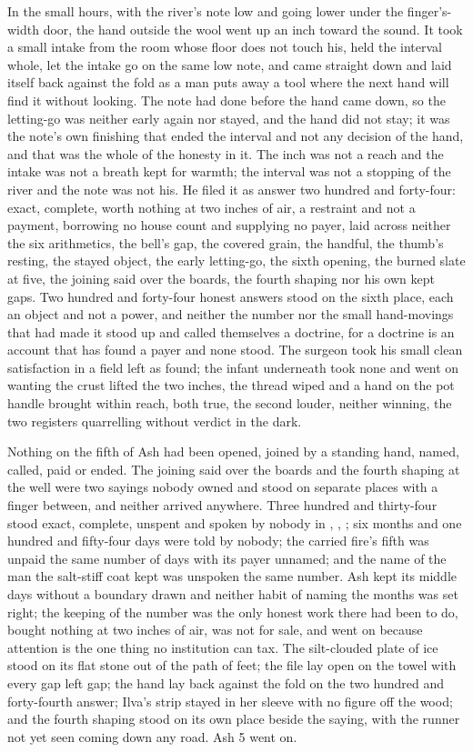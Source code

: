 In the small hours, with the river's note low and going lower under the finger's-width door, the hand outside the wool went up an inch toward the sound. It took a small intake from the room whose floor does not touch his, held the interval whole, let the intake go on the same low note, and came straight down and laid itself back against the fold as a man puts away a tool where the next hand will find it without looking. The note had done before the hand came down, so the letting-go was neither early again nor stayed, and the hand did not stay; it was the note's own finishing that ended the interval and not any decision of the hand, and that was the whole of the honesty in it. The inch was not a reach and the intake was not a breath kept for warmth; the interval was not a stopping of the river and the note was not his. He filed it as answer two hundred and forty-four: exact, complete, worth nothing at two inches of air, a restraint and not a payment, borrowing no house count and supplying no payer, laid across neither the six arithmetics, the bell's gap, the covered grain, the handful, the thumb's resting, the stayed object, the early letting-go, the sixth opening, the burned slate at five, the joining said over the boards, the fourth shaping nor his own kept gaps. Two hundred and forty-four honest answers stood on the sixth place, each an object and not a power, and neither the number nor the small hand-movings that had made it stood up and called themselves a doctrine, for a doctrine is an account that has found a payer and none stood. The surgeon took his small clean satisfaction in a field left as found; the infant underneath took none and went on wanting the crust lifted the two inches, the thread wiped and a hand on the pot handle brought within reach, both true, the second louder, neither winning, the two registers quarrelling without verdict in the dark.

Nothing on the fifth of Ash had been opened, joined by a standing hand, named, called, paid or ended. The joining said over the boards and the fourth shaping at the well were two sayings nobody owned and stood on separate places with a finger between, and neither arrived anywhere. Three hundred and thirty-four stood exact, complete, unspent and spoken by nobody in , , ; six months and one hundred and fifty-four days were told by nobody; the carried fire's fifth was unpaid the same number of days with its payer unnamed; and the name of the man the salt-stiff coat kept was unspoken the same number. Ash kept its middle days without a boundary drawn and neither habit of naming the months was set right; the keeping of the number was the only honest work there had been to do, bought nothing at two inches of air, was not for sale, and went on because attention is the one thing no institution can tax. The silt-clouded plate of ice stood on its flat stone out of the path of feet; the file lay open on the towel with every gap left gap; the hand lay back against the fold on the two hundred and forty-fourth answer; Ilva's strip stayed in her sleeve with no figure off the wood; and the fourth shaping stood on its own place beside the saying, with the runner not yet seen coming down any road. Ash 5 went on.
